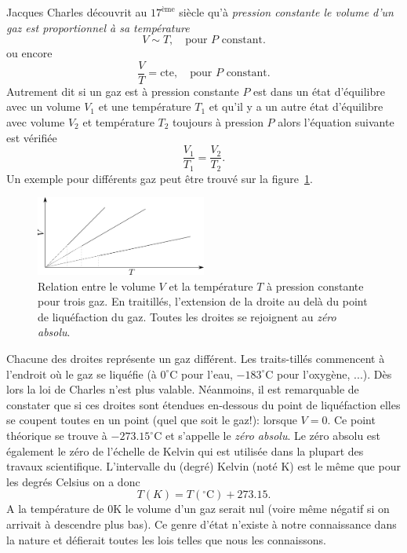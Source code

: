 \documentclass[a4paper,12pt]{book}
\newcommand{\K}{\mathrm{K}}
\newcommand{\C}{\mathrm{C}}
\begin{document}
Jacques Charles découvrit au $17^\textrm{\`eme}$ siècle 
qu'à \textit{pression constante le volume d'un gaz est proportionnel à sa température} 
\begin{equation}
V\sim T,\quad \mbox{pour }P\mbox{ constant.}
\end{equation}
ou encore 
\begin{equation}
\frac{V}{T}=\mbox{cte},\quad \mbox{pour }P\mbox{ constant.}\label{eq_loi_charles}
\end{equation}
Autrement dit si un gaz est à pression constante $P$ est dans un état d'équilibre avec un volume $V_1$ et
une température $T_1$ et qu'il y a un autre état d'équilibre avec volume $V_2$ et température $T_2$ toujours à pression $P$ alors l'équation suivante est vérifiée
\begin{equation}
\frac{V_1}{T_1}=\frac{V_2}{T_2}.
\end{equation}
Un exemple pour différents gaz peut être trouvé sur la figure~\ref{fig_charles}.
\begin{figure}
\begin{center}
\includegraphics[width=0.5\textwidth]{figs/charles.pdf}
\caption{Relation entre le volume $V$ et la température $T$ à pression constante pour trois gaz. En traitillés, l'extension de la droite au delà du point de liquéfaction du gaz. Toutes les droites se rejoignent au \textit{zéro absolu}.}
\label{fig_charles}
\end{center}
\end{figure}
Chacune des droites représente un gaz différent. Les traits-tillés commencent à l'endroit où le gaz se liquéfie 
(à $0^\circ\C$ pour l'eau, $-183^\circ\C$ pour l'oxygène, ...). 
Dès lors la loi de Charles n'est plus valable. Néanmoins,
il est remarquable de constater que si ces droites sont étendues en-dessous du point de liquéfaction elles se coupent toutes en un point (quel que soit le gaz!): lorsque $V=0$. Ce point théorique se trouve à $-273.15^\circ\C$ et s'appelle le
\textit{zéro absolu}. Le zéro absolu est également le zéro
de l'échelle de Kelvin qui est utilisée dans la plupart des travaux scientifique. L'intervalle du (degré) Kelvin (noté $\K$) est le même que pour les degrés Celsius on a donc
\begin{equation}
T(K)=T(^\circ\C)+273.15.
\end{equation}
A la température de $0\K$ le volume d'un gaz serait nul 
(voire même négatif si on arrivait à descendre plus bas).
Ce genre d'état n'existe à notre connaissance dans la nature et 
défierait toutes les lois telles que nous les connaissons.
\end{document}

